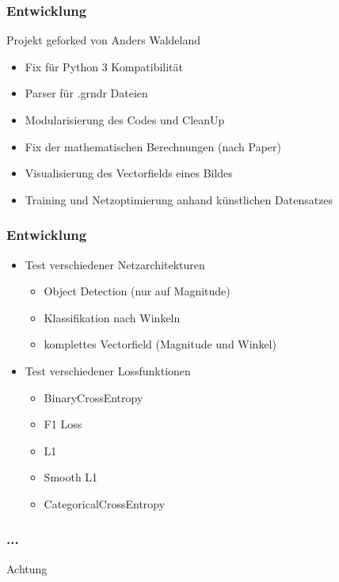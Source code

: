 \begin{frame}
	\frametitle{Entwicklung}
	Projekt geforked von Anders Waldeland
	\begin{itemize}
		\item Fix für Python 3 Kompatibilität
		\item Parser für .grndr Dateien
		\item Modularisierung des Codes und CleanUp
		\item Fix der mathematischen Berechnungen (nach Paper)
		\item Visualisierung des Vectorfields eines Bildes
		\item Training und Netzoptimierung anhand künstlichen Datensatzes
	\end{itemize}
\end{frame}

\begin{frame}
	\frametitle{Entwicklung}
	\begin{itemize}
		\item Test verschiedener Netzarchitekturen
		\begin{itemize}
			\item Object Detection (nur auf Magnitude)
			\item Klassifikation nach Winkeln
			\item komplettes Vectorfield (Magnitude und Winkel)
		\end{itemize}
		\item Test verschiedener Lossfunktionen
		\begin{itemize}
			\item BinaryCrossEntropy
			\item F1 Loss
			\item L1
			\item Smooth L1
			\item CategoricalCrossEntropy
		\end{itemize}
	\end{itemize}
\end{frame}

\begin{frame}
	\frametitle{...}
	\begin{alertblock}{Achtung}
	\end{alertblock}
\end{frame}